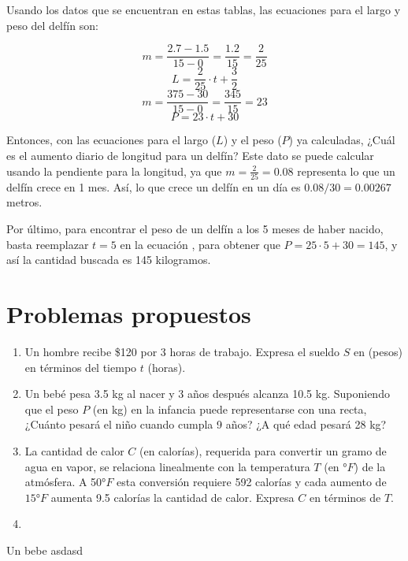 \documentclass{ceas2}
\begin{document}
Usando los datos que se encuentran en estas tablas, las ecuaciones para el largo y peso 
del delfín son:

\begin{multicols}{2}\setlength{\columnseprule}{0.4pt}
    \noindent
        \begin{equation*}
            m = \dfrac{2.7 - 1.5}{15 - 0} = \dfrac{1.2}{15} = \dfrac{2}{25}
        \end{equation*}
        \begin{equation}\label{eq:l}
            L = \dfrac{2}{25}\cdot t + \dfrac{3}{2}
        \end{equation}
        \begin{equation*}
            m = \dfrac{375 - 30}{15 - 0} = \dfrac{345}{15} = 23
        \end{equation*}
        \begin{equation}\label{eq:p}
            P = 23\cdot t + 30
        \end{equation}
\end{multicols}

Entonces, con las ecuaciones para el largo ($L$) y el peso ($P$) ya calculadas, ¿Cuál 
es el aumento diario de longitud para un delfín? Este dato se puede calcular usando la
pendiente para la longitud, ya que $m=\frac{2}{25}=0.08$ representa lo que un delfín
crece en 1 mes. Así, lo que crece un delfín en un día es $0.08/30=0.00267$ metros.

Por último, para encontrar el peso de un delfín a los 5 meses de haber nacido,
basta reemplazar $t=5$ en la ecuación , para obtener que 
$P=25\cdot 5 + 30 = 145$, y así la cantidad buscada es 145 kilogramos.

\section{Problemas propuestos}

\begin{enumerate}[label=(\arabic*)]
    \item Un hombre recibe \$120 por 3 horas de trabajo. Expresa el sueldo $S$ en (pesos)
    en términos del tiempo $t$ (horas).
    \desarrollo
    \item Un bebé pesa 3.5 kg al nacer y 3 años después alcanza 10.5 kg. Suponiendo 
    que el peso $P$ (en kg) en la infancia puede representarse con una recta,
    ¿Cuánto pesará el niño cuando cumpla 9 años? ¿A qué edad pesará 28 kg?
    \desarrollo[5cm]
    \item La cantidad de calor $C$ (en calorías), requerida para convertir un gramo de 
    agua en vapor, se relaciona linealmente con la temperatura $T$ (en °$F$) de la 
    atmósfera. A 50°$F$ esta conversión requiere 592 calorías y cada aumento de 
    $15°F$ aumenta 9.5 calorías la cantidad de calor. Expresa $C$ en términos de $T$.
    \desarrollo[5cm]
    \item \lipsum[1]
\end{enumerate}

\e 

\e Un bebe 
\e asdasd
\end{document}
